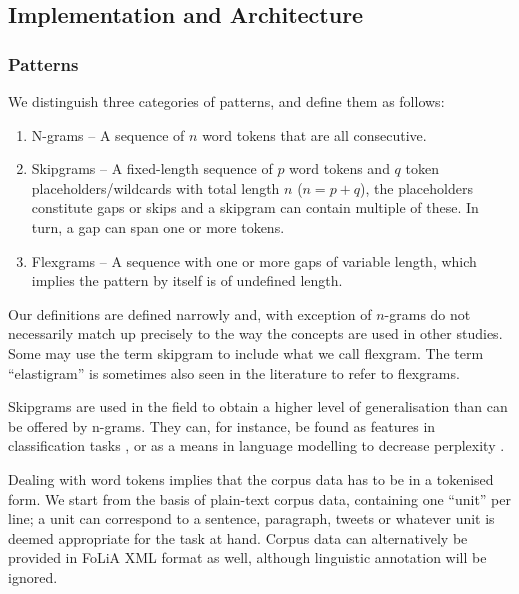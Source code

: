 \documentclass[a4paper,12pt]{article}
\begin{document}
\subsection{Implementation and Architecture}

\subsubsection{Patterns}

We distinguish three categories of patterns, and define them as follows:

\begin{enumerate}
    \item N-grams -- A sequence of $n$ word tokens that are all consecutive.
    \item Skipgrams -- A fixed-length sequence of $p$ word tokens and $q$ token
        placeholders/wildcards with total length $n$ ($n=p+q$), the placeholders constitute gaps or skips and a skipgram can contain multiple of these. In turn, a gap can span one or more tokens. 
    \item Flexgrams -- A sequence with one or more gaps of variable length, which implies the pattern by itself is of undefined length.
\end{enumerate}

Our definitions are defined narrowly and, with exception of $n$-grams do not
necessarily match up precisely to the way the concepts are used in other studies. Some
may use the term skipgram to include what we call flexgram.  The term
``elastigram'' is sometimes also seen in the literature to refer to flexgrams. 

Skipgrams are used in the field to obtain a higher level of generalisation than
can be offered by n-grams. They can, for instance, be found as features in
classification tasks \cite{DHONDT}, or as a means in language modelling to
decrease perplexity \cite{Guthrie06}.

Dealing with word tokens implies that the corpus data has to be in a
tokenised form. We start from the basis of plain-text corpus data, containing one
``unit'' per line; a unit can correspond to a sentence, paragraph, tweets
or whatever unit is deemed appropriate for the task at hand. Corpus data can
alternatively be provided in FoLiA XML format \cite{FOLIAPAPER} as well, although linguistic
annotation will be ignored.
\end{document}
